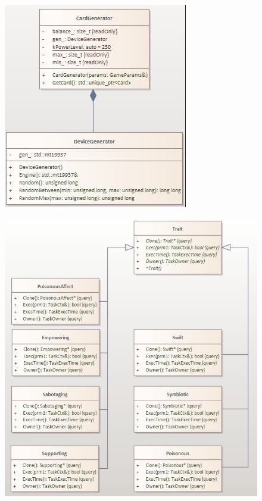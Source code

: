 \begin{figure}[H]
    \centering
    \includegraphics[width=\textwidth /2]{CD2.png}
\end{figure}
\begin{figure}[H]
    \centering
    \includegraphics[width=\textwidth /4 *3]{CD3.png}
\end{figure}


